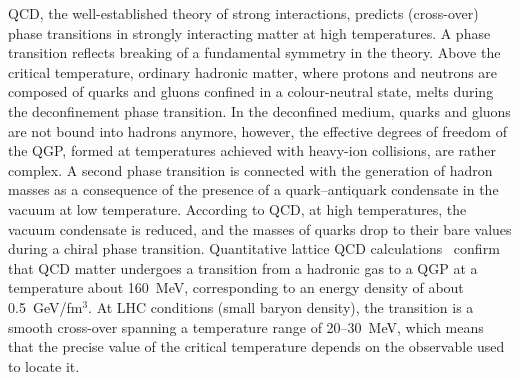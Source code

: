 QCD, the well-established theory of strong interactions, predicts (cross-over) phase transitions in strongly interacting matter at high temperatures. A phase transition reflects breaking of a fundamental symmetry in the theory. Above the critical temperature, ordinary hadronic matter, where protons and neutrons are composed of quarks and gluons confined in a colour-neutral state, melts during the deconfinement phase transition. In the deconfined medium, quarks and gluons are not bound into hadrons anymore, however, the effective degrees of freedom of the QGP, formed at temperatures achieved with heavy-ion collisions, are rather complex. A second phase transition is connected with the generation of hadron masses as a consequence of the presence of a quark--antiquark condensate in the vacuum at low temperature. According to QCD, at high temperatures, the vacuum condensate is reduced, and the masses of quarks drop to their bare values during a chiral phase transition. Quantitative lattice QCD calculations~\cite{Borsanyi:2010bp} confirm that QCD matter undergoes a transition from a hadronic gas to a QGP at a temperature about 160~MeV, corresponding to an energy density of about 0.5~GeV/fm$^3$. At LHC conditions (small baryon density), the transition is a smooth cross-over spanning a temperature range of 20--30~MeV, which means that the precise value of the critical temperature depends on the observable used to locate it.

